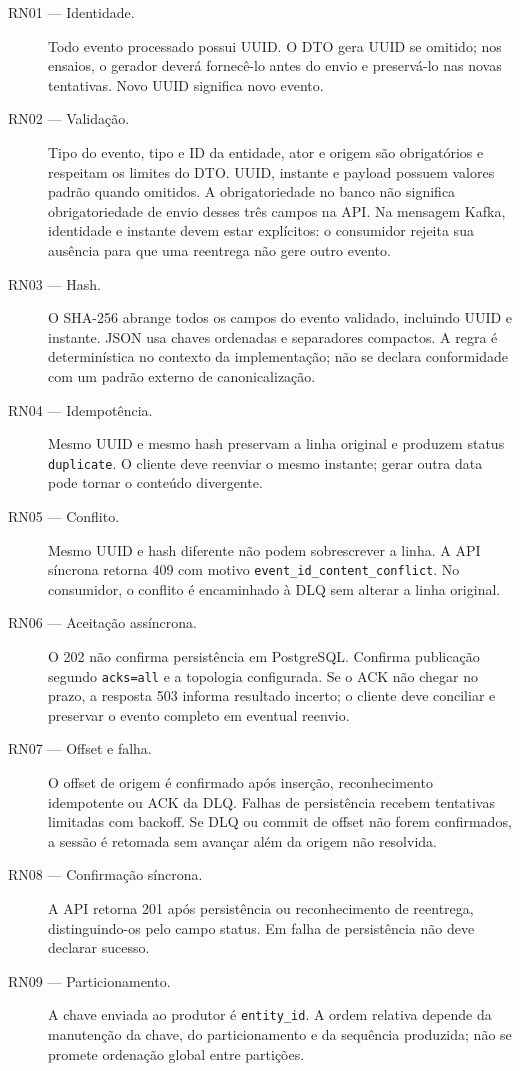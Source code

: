 \begin{description}
\item[RN01 --- Identidade.] Todo evento processado possui UUID. O DTO gera UUID se omitido; nos ensaios, o gerador deverá fornecê-lo antes do envio e preservá-lo nas novas tentativas. Novo UUID significa novo evento.
\item[RN02 --- Validação.] Tipo do evento, tipo e ID da entidade, ator e origem são obrigatórios e respeitam os limites do DTO. UUID, instante e payload possuem valores padrão quando omitidos. A obrigatoriedade no banco não significa obrigatoriedade de envio desses três campos na API. Na mensagem Kafka, identidade e instante devem estar explícitos: o consumidor rejeita sua ausência para que uma reentrega não gere outro evento.
\item[RN03 --- Hash.] O SHA-256 abrange todos os campos do evento validado, incluindo UUID e instante. JSON usa chaves ordenadas e separadores compactos. A regra é determinística no contexto da implementação; não se declara conformidade com um padrão externo de canonicalização.
\item[RN04 --- Idempotência.] Mesmo UUID e mesmo hash preservam a linha original e produzem status \texttt{duplicate}. O cliente deve reenviar o mesmo instante; gerar outra data pode tornar o conteúdo divergente.
\item[RN05 --- Conflito.] Mesmo UUID e hash diferente não podem sobrescrever a linha. A API síncrona retorna 409 com motivo \texttt{event\_id\_content\_conflict}. No consumidor, o conflito é encaminhado à DLQ sem alterar a linha original.
\item[RN06 --- Aceitação assíncrona.] O 202 não confirma persistência em PostgreSQL. Confirma publicação segundo \texttt{acks=all} e a topologia configurada. Se o ACK não chegar no prazo, a resposta 503 informa resultado incerto; o cliente deve conciliar e preservar o evento completo em eventual reenvio.
\item[RN07 --- Offset e falha.] O offset de origem é confirmado após inserção, reconhecimento idempotente ou ACK da DLQ. Falhas de persistência recebem tentativas limitadas com backoff. Se DLQ ou commit de offset não forem confirmados, a sessão é retomada sem avançar além da origem não resolvida.
\item[RN08 --- Confirmação síncrona.] A API retorna 201 após persistência ou reconhecimento de reentrega, distinguindo-os pelo campo status. Em falha de persistência não deve declarar sucesso.
\item[RN09 --- Particionamento.] A chave enviada ao produtor é \texttt{entity\_id}. A ordem relativa depende da manutenção da chave, do particionamento e da sequência produzida; não se promete ordenação global entre partições.

\end{description}
